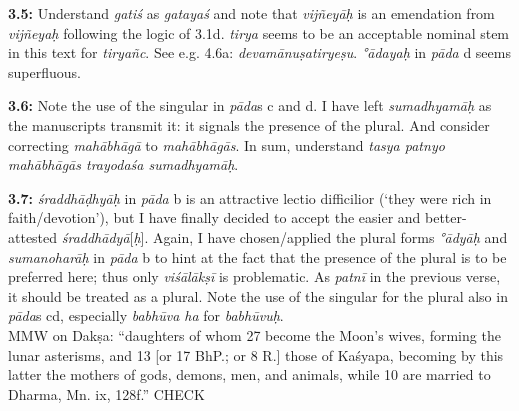 \documentclass{article}
\newcommand{\vsnum}[1]{\textbf{#1}}
\newcommand{\skt}[1]{\textit{#1}}
\begin{document}
\vsnum{3.5: }Understand \skt{gatiś} as \skt{gatayaś} and note that \skt{vijñeyāḥ} is an emendation from \skt{vijñeyaḥ} following the logic of 3.1d. \skt{tirya} seems to be an acceptable nominal stem in this text for \skt{tiryañc}. See e.g. 4.6a: \skt{devamānuṣatiryeṣu}. \skt{°ādayaḥ} in \skt{pāda} d seems superfluous.

\vsnum{3.6: }Note the use of the singular in \skt{pāda}s c and d. I have left \skt{sumadhyamāḥ} as the manuscripts transmit it: it signals the presence of the plural. And consider correcting \skt{mahābhāgā} to \skt{mahābhāgās}. In sum, understand \skt{tasya patnyo mahābhāgās trayodaśa sumadhyamāḥ}.

\vsnum{3.7: }\skt{śraddhāḍhyāḥ} in \skt{pāda} b is an attractive lectio difficilior (`they were rich in faith/devotion'), but I have finally decided to accept the easier and better-attested \skt{śraddhādyā}[\skt{ḥ}]. Again, I have chosen/applied the plural forms \skt{°ādyāḥ} and \skt{sumanoharāḥ} in \skt{pāda} b to hint at the fact that the presence of the plural is to be preferred here; thus only \skt{viśālākṣī} is problematic. As \skt{patnī} in the previous verse, it should be treated as a plural. Note the use of the singular for the plural also in \skt{pāda}s cd, especially \skt{babhūva ha} for \skt{babhūvuḥ}. \\ MMW on Dakṣa: ``daughters of whom 27 become the Moon's wives, forming the lunar asterisms, and 13 [or 17 BhP.; or 8 R.] those of Kaśyapa, becoming by this latter the mothers of gods, demons, men, and animals, while 10 are married to Dharma, Mn. ix, 128f.'' CHECK
\end{document}
